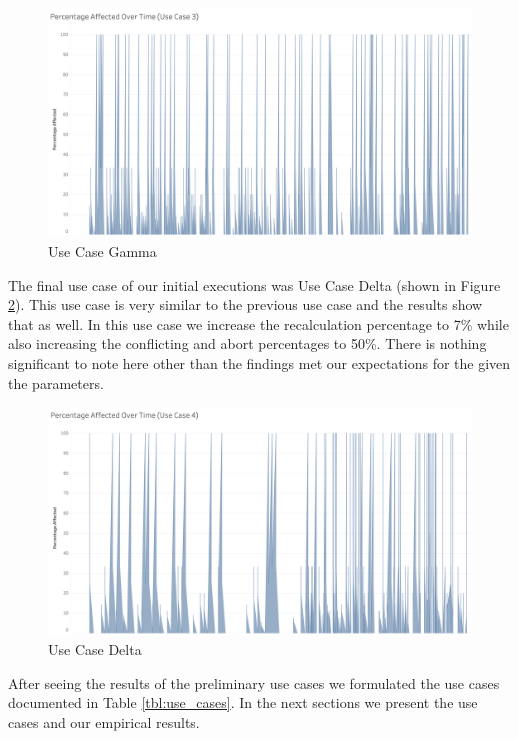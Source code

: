 \begin{figure}
\centering
\includegraphics[scale=0.35]{images/UseCase3.png}
\caption{Use Case Gamma}
\label{image:use_case_gamma}
\end{figure}

The final use case of our initial executions was Use Case Delta (shown in Figure \ref{image:use_case_delta}). This use case is very similar to the previous use case and the results show that as well. In this use case we increase the recalculation percentage to 7\% while also increasing the conflicting and abort percentages to 50\%. There is nothing significant to note here other than the findings met our expectations for the given the parameters.

\begin{figure}
\centering
\includegraphics[scale=0.35]{images/UseCase4.png}
\caption{Use Case Delta}
\label{image:use_case_delta}
\end{figure}

After seeing the results of the preliminary use cases we formulated the use cases documented in Table \ref{tbl:use_cases}.
In the next sections we present the use cases and our empirical results.